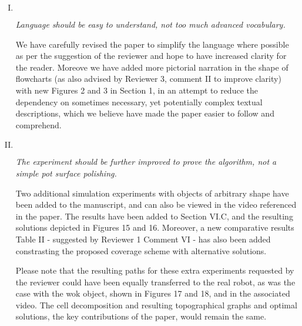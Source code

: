\documentclass[11pt]{article}
\newenvironment{reviewer}
{\begin{mdframed}[roundcorner = 10pt,fontcolor=blue!70!black]\itshape}
{\end{mdframed}}
\begin{document}
\begin{enumerate}[I.]
  \item $ $
  \begin{reviewer}
    Language should be easy to understand, not too much advanced vocabulary.
   \end{reviewer}
  \noindent We have carefully revised the paper to simplify the language where possible as per the suggestion of the reviewer and hope to have increased clarity for the reader. Moreove we have added more pictorial narration in the shape of flowcharts (as also advised by Reviewer 3, comment II to improve clarity) 
with new Figures 2 and 3 in Section 1, in an attempt to reduce the dependency on sometimes necessary, yet potentially complex textual descriptions, which we believe have made the paper easier to follow and comprehend. 
  
  
  \item $ $
  \begin{reviewer}
    The experiment should be further improved to prove the algorithm, not a simple pot surface polishing.
   \end{reviewer}
  \noindent Two additional simulation experiments with objects of arbitrary shape have been added to the manuscript, and can also be viewed in the video referenced in the paper. 
  The results have been added to Section VI.C, and the resulting solutions depicted in Figures 15 and 16. Moreover, a new comparative results Table II - suggested by Reviewer 1 Comment VI - has also been added constrasting the proposed coverage scheme with alternative solutions.
  
  Please note that the resulting paths for these extra experiments requested by the reviewer could have been equally transferred to the real robot, as was the case with the wok object, shown in Figures 17 and 18, and in the associated video. The cell decomposition and resulting topographical graphs and optimal solutions, the key contributions of the paper, would remain the same. 


\end{enumerate}
\end{document}
